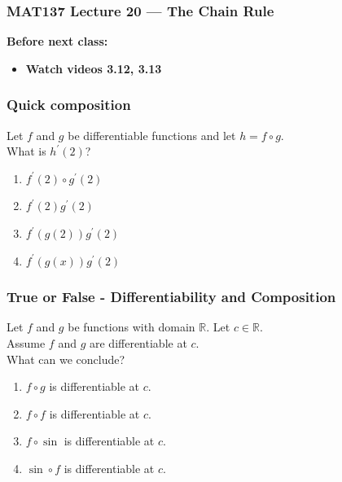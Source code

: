 \documentclass[14pt]{beamer}
\newcommand {\R}{\mathbb{R}}
\newcommand{\azul}[1]{{\color{blue} #1}}
\begin{document}
\begin{frame}
	\frametitle{MAT137 Lecture 20 --- The Chain Rule}

	\vfill
	{\bf Before next class:}
		\begin{itemize} \normalsize
			\item {\bf Watch videos 3.12, 3.13 }
		\end{itemize}
\end{frame}


\begin{frame}
\frametitle{Quick composition}

 Let $f$ and $g$ be differentiable functions and let $h=f\circ g$. \\ What is $h^{\prime}(2)$?
\begin {enumerate}
\item $f^{\prime}(2)\circ g^{\prime}(2)$
\item $f^{\prime}(2)g^{\prime}(2)$
\item $f^{\prime}(g(2)) g^{\prime}(2)$
\item $f^{\prime}(g(x)) g^{\prime}(2)$
\end{enumerate}

\end{frame}

\begin{frame}[t]
\frametitle{True or False - Differentiability and Composition}

Let $f$ and $g$ be functions with domain $\R$.  Let $c \in \R$. \\
Assume $f$ and $g$ are differentiable at $c$.  \\
What can we conclude?

\vfill

\begin{enumerate}
	
	\item $f \circ g$ \; is \azul{differentiable} at $c$.
\vfill
	\item $f \circ f$ \; is \azul{differentiable} at $c$.
\vfill
	\item $f \circ \sin$ \; is \azul{differentiable} at $c$.
\vfill
	\item $\sin \circ f$ \; is \azul{differentiable} at $c$.
\vfill
\end{enumerate}
 
\end{frame}
\end{document}
